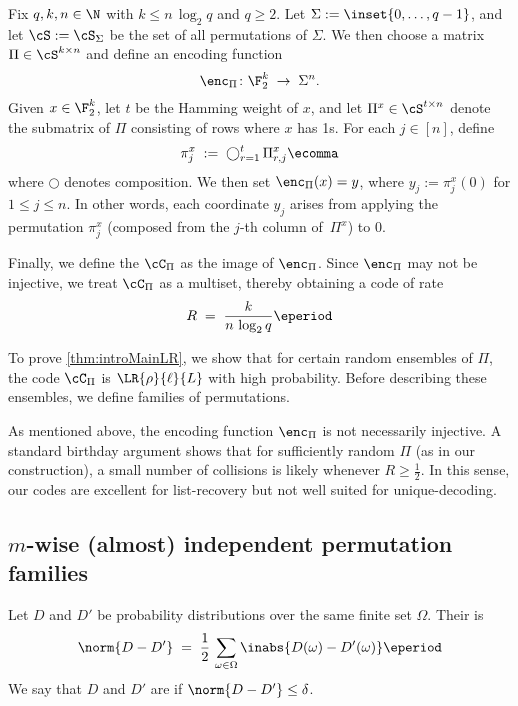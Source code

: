 \documentclass[11pt]{article}
\begin{document}
Fix $q,k,n \in \N$ with $k \le n \,\log_2 q$ and $q \ge 2$. Let $\Sigma := \inset{0,\dots,q-1}$, and let $\cS := \cS_{\Sigma}$ be the set of all permutations of $\Sigma$. We then choose a matrix $\Pi \in \cS^{k \times n}$ and define an encoding function 
\[
\enc_\Pi \colon \F_2^k \;\to\; \Sigma^n.
\]
Given $x \in \F_2^k$, let $t$ be the Hamming weight of $x$, and let $\Pi^x \in \cS^{t \times n}$ denote the submatrix of $\Pi$ consisting of rows where $x$ has 1s. For each $j \in [n]$, define 
\[
\pi_j^x \;:=\; \bigcirc_{r=1}^{t} \,\Pi^x_{r,j}\ecomma
\]
where $\bigcirc$ denotes composition. We then set $\enc_\Pi(x) = y$, where $y_j := \pi_j^x(0)$ for $1 \le j \le n$. In other words, each coordinate $y_j$ arises from applying the permutation $\pi_j^x$ (composed from the $j$-th column of~$\Pi^x$) to $0$. 

Finally, we define the  $\cC_\Pi$ as the image of $\enc_\Pi$. Since $\enc_\Pi$ may not be injective, we treat $\cC_\Pi$ as a multiset, thereby obtaining a code of rate
\[
R \;=\; \frac{k}{n \,\log_2 q}\eperiod
\]

To prove \cref{thm:introMainLR}, we show that for certain random ensembles of $\Pi$, the code $\cC_\Pi$ is $\LR{\rho}{\ell}{L}$ with high probability. Before describing these ensembles, we define  families of permutations.

\begin{remark}
    As mentioned above, the encoding function $\enc_\Pi$ is not necessarily injective. A standard birthday argument shows that for sufficiently random $\Pi$ (as in our construction), a small number of collisions is likely whenever $R \ge \tfrac12$. In this sense, our codes are excellent for list-recovery but not well suited for unique-decoding.
\end{remark}

\subsection{$m$-wise (almost) independent permutation families}

\begin{definition}
  Let $D$ and $D'$ be probability distributions over the same finite set $\Omega$. Their  is
  $$
  \norm{D - D'}
  \;=\;
  \frac12 \,\sum_{\omega \in \Omega} \inabs{D(\omega) - D'(\omega)}\eperiod
  $$
  We say that $D$ and $D'$ are  if $\norm{D - D'} \le \delta$.
\end{definition}
\end{document}
